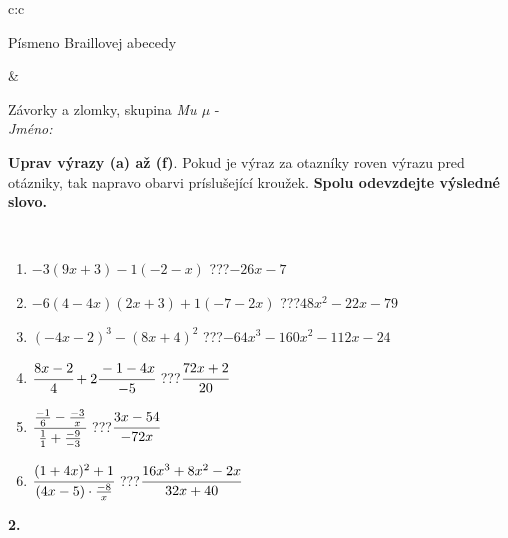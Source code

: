 \documentclass[10pt]{report}
\begin{document}
\begin{tabular}{c:c}
\begin{minipage}[c][104.5mm][t]{0.5\linewidth}
\begin{center}
\begin{minipage}{0.20\linewidth}
\begin{center}
{\small Písmeno Braillovej abecedy}
\end{center}
\end{minipage}
\end{center}
\end{minipage}
&
\begin{minipage}[c][104.5mm][t]{0.5\linewidth}
\begin{center}
\vspace{7mm}
{\huge Závorky a zlomky, skupina \textit{Mu $\mu$} -}\\[5mm]
\textit{Jméno:}\phantom{xxxxxxxxxxxxxxxxxxxxxxxxxxxxxxxxxxxxxxxxxxxxxxxxxxxxxxxxxxxxxxxxx}\\[5mm]
\begin{minipage}{0.95\linewidth}
\begin{center}
\textbf{Uprav výrazy (a) až (f)}. Pokud je výraz za otazníky roven výrazu pred otázniky, tak napravo obarvi príslušející kroužek. \textbf{Spolu odevzdejte výsledné slovo.}
\end{center}
\end{minipage}
\\[1mm]
\begin{minipage}{0.79\linewidth}
\begin{center}
\begin{varwidth}{\linewidth}
\begin{enumerate}
\normalsize
\item $-3(9x+3)-1(-2-x)$\quad \dotfill\; ???\;\dotfill \quad $-26x-7$
\item $-6(4-4x)(2x+3)+1(-7-2x)$\quad \dotfill\; ???\;\dotfill \quad $48x^2-22x-79$
\item $(-4x-2)^3-(8x+4)^2$\quad \dotfill\; ???\;\dotfill \quad $-64x^3-160x^2-112x-24$
\item $\cfrac{8x-2}{4}+2\cfrac{-1-4x}{-5}$\quad \dotfill\; ???\;\dotfill \quad $\cfrac{72x+2}{20}$
\item $\cfrac{\frac{-1}{6}-\frac{-3}{x}}{\frac{1}{1}+\frac{-9}{-3}}$\quad \dotfill\; ???\;\dotfill \quad $\cfrac{3x-54}{-72x}$
\item $\cfrac{(1+4x)^2+1}{(4x-5)\cdot\frac{-8}{x}}$\quad \dotfill\; ???\;\dotfill \quad $\cfrac{16x^3+8x^2-2x}{32x+40}$
\end{enumerate}
\end{varwidth}
\end{center}
\end{minipage}
\begin{minipage}{0.20\linewidth}
\begin{center}
{\Huge\bfseries 2.} \\[2mm]

\end{center}
\end{minipage}
\end{center}
\end{minipage}
\end{tabular}
\end{document}
